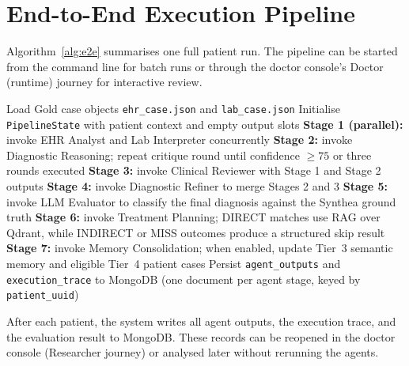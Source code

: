 \FloatBarrier
\section{End-to-End Execution Pipeline}
\label{sec:pipeline_e2e}

Algorithm~\ref{alg:e2e} summarises one full patient run. The pipeline can be
started from the command line for batch runs or through the doctor console's
Doctor (runtime) journey for interactive review.

\begin{algorithm}[ht]
\caption{End-to-end processing of a single patient.}
\label{alg:e2e}
\begin{algorithmic}[1]
\STATE Load Gold case objects \texttt{ehr\_case.json} and \texttt{lab\_case.json}
\STATE Initialise \texttt{PipelineState} with patient context and empty output slots
\STATE \textbf{Stage 1 (parallel):} invoke EHR Analyst and Lab Interpreter concurrently
\STATE \textbf{Stage 2:} invoke Diagnostic Reasoning; repeat critique round until
       confidence $\geq 75$ or three rounds executed
\STATE \textbf{Stage 3:} invoke Clinical Reviewer with Stage 1 and Stage 2 outputs
\STATE \textbf{Stage 4:} invoke Diagnostic Refiner to merge Stages 2 and 3
\STATE \textbf{Stage 5:} invoke LLM Evaluator to classify the final diagnosis
       against the Synthea ground truth
\STATE \textbf{Stage 6:} invoke Treatment Planning; DIRECT matches use RAG over
       Qdrant, while INDIRECT or MISS outcomes produce a structured skip result
\STATE \textbf{Stage 7:} invoke Memory Consolidation; when enabled, update
       Tier~3 semantic memory and eligible Tier~4 patient cases
\STATE Persist \texttt{agent\_outputs} and \texttt{execution\_trace} to MongoDB
       (one document per agent stage, keyed by \texttt{patient\_uuid})
\end{algorithmic}
\end{algorithm}

After each patient, the system writes all agent outputs, the execution trace,
and the evaluation result to MongoDB. These records can be reopened in the
doctor console (Researcher journey) or analysed later without rerunning the
agents.
